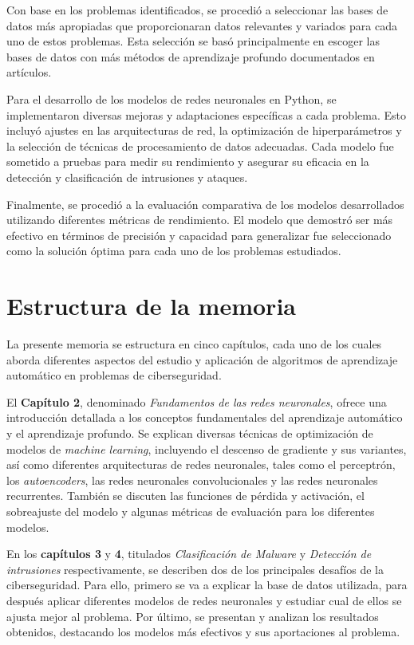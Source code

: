 Con base en los problemas identificados, se procedió a seleccionar las bases de datos más apropiadas que proporcionaran datos relevantes y variados para cada uno de estos problemas. Esta selección se basó principalmente en escoger las bases de datos con más métodos de aprendizaje profundo documentados en artículos.

Para el desarrollo de los modelos de redes neuronales en Python, se implementaron diversas mejoras y adaptaciones específicas a cada problema. Esto incluyó ajustes en las arquitecturas de red, la optimización de hiperparámetros y la selección de técnicas de procesamiento de datos adecuadas. Cada modelo fue sometido a pruebas para medir su rendimiento y asegurar su eficacia en la detección y clasificación de intrusiones y ataques.

Finalmente, se procedió a la evaluación comparativa de los modelos desarrollados utilizando diferentes métricas de rendimiento. El modelo que demostró ser más efectivo en términos de precisión y capacidad para generalizar fue seleccionado como la solución óptima para cada uno de los problemas estudiados.


\section{Estructura de la memoria} \label{Subsubsec: 1_4}

La presente memoria se estructura en cinco capítulos, cada uno de los cuales aborda diferentes aspectos del estudio y aplicación de algoritmos de aprendizaje automático en problemas de ciberseguridad. 


El \textbf{Capítulo 2}, denominado \textit{Fundamentos de las redes neuronales}, ofrece una introducción detallada a los conceptos fundamentales del aprendizaje automático y el aprendizaje profundo. Se explican diversas técnicas de optimización de modelos de \textit{machine learning}, incluyendo el descenso de gradiente y sus variantes, así como diferentes arquitecturas de redes neuronales, tales como el perceptrón, los \textit{autoencoders}, las redes neuronales convolucionales y las redes neuronales recurrentes. También se discuten las funciones de pérdida y activación, el sobreajuste del modelo y algunas métricas de evaluación para los diferentes modelos.

En los \textbf{capítulos 3} y \textbf{4}, titulados \textit{Clasificación de Malware} y \textit{Detección de intrusiones} respectivamente, se describen dos de los principales desafíos de la ciberseguridad. Para ello, primero se va a explicar la base de datos utilizada, para después aplicar diferentes modelos de redes neuronales y estudiar cual de ellos se ajusta mejor al problema. Por último, se presentan y analizan los resultados obtenidos, destacando los modelos más efectivos y sus aportaciones al problema.

